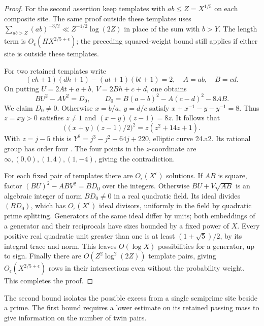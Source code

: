 \documentclass[11pt]{article}
\begin{document}
\begin{proof}
For the second assertion keep templates with \(ab\le Z=X^{1/5}\)
on each composite site. The same proof outside these templates
uses \(\sum_{ab>Z}(ab)^{-3/2}\ll Z^{-1/2}\log(2Z)\) in place of
the sum with \(b>Y\). The length term is
\(O_\epsilon(HX^{2/5+\epsilon})\); the preceding squared-weight
bound still applies if either site is outside these templates.

For two retained templates write
\[
 (ch+1)(dh+1)-(at+1)(bt+1)=2,\quad A=ab,\quad B=cd .
\]
On putting \(U=2At+a+b,\ V=2Bh+c+d\), one obtains
\[
 BU^2-AV^2=D_0,\qquad
 D_0=B(a-b)^2-A(c-d)^2-8AB .
\]
We claim \(D_0\ne0\). Otherwise \(x=b/a,\ y=d/c\) satisfy
\(x+x^{-1}-y-y^{-1}=8\). Thus \(z=xy>0\) satisfies \(z\ne1\)
and \((x-y)(z-1)=8z\). It follows that
\[
 \big((x+y)(z-1)/2\big)^2=z(z^2+14z+1).
\]
With \(z=j-5\) this is \(Y^2=j^3-j^2-64j+220\), elliptic curve
24.a2. Its rational group has order four \cite{E24}. The four points
in the \(z\)-coordinate are \(\infty,(0,0),(1,4),(1,-4)\), giving the
contradiction.

For each fixed pair of templates there are \(O_\epsilon(X^\epsilon)\)
solutions. If \(AB\) is square, factor \((BU)^2-ABV^2=BD_0\) over
the integers. Otherwise \(BU+V\sqrt{AB}\) is an algebraic integer of
norm \(BD_0\ne0\) in a real quadratic field. Its ideal divides
\((BD_0)\), which has \(O_\epsilon(X^\epsilon)\) ideal divisors,
uniformly in the field by quadratic prime splitting. Generators of the
same ideal differ by units; both embeddings of a generator and their
reciprocals have sizes bounded by a fixed power of \(X\).
Every positive real quadratic unit greater than one is at least
\((1+\sqrt5)/2\), by its integral trace and norm. This leaves
\(O(\log X)\) possibilities for a generator, up to sign. Finally
there are \(O(Z^2\log^2(2Z))\) template pairs, giving
\(O_\epsilon(X^{2/5+\epsilon})\) rows in their intersections even
without the probability weight. This completes the proof.
\end{proof}

The second bound isolates the possible excess from a single
semiprime site beside a prime. The first bound requires a lower
estimate on its retained passing mass to give information on the
number of twin pairs.
\end{document}
